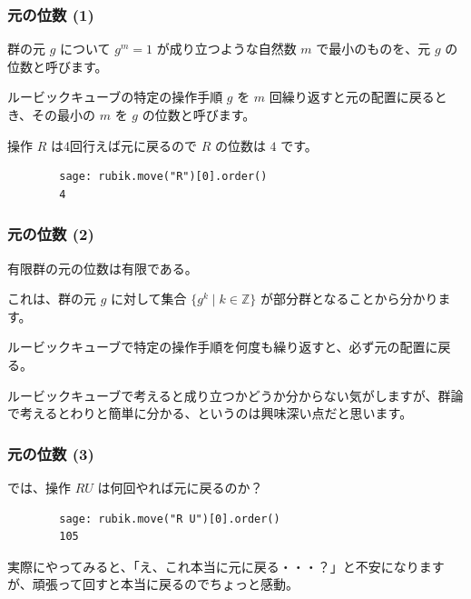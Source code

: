 \documentclass{beamer}
\begin{document}
\begin{frame}[fragile=singleslide]
    \frametitle{元の位数 (1)}

    \begin{definition}
        群の元 \(g\) について \(g^m = 1\) が成り立つような自然数 \(m\) で最小のものを、元 \(g\) の位数と呼びます。
    \end{definition}

    \begin{definition}
        ルービックキューブの特定の操作手順 \(g\) を \(m\) 回繰り返すと元の配置に戻るとき、その最小の \(m\) を \(g\) の位数と呼びます。
    \end{definition}

    操作 \(R\) は4回行えば元に戻るので \(R\) の位数は \(4\) です。

    \begin{verbatim}
        sage: rubik.move("R")[0].order()
        4
    \end{verbatim}
\end{frame}

\begin{frame}
    \frametitle{元の位数 (2)}

    \begin{theorem}
        有限群の元の位数は有限である。
    \end{theorem}

    これは、群の元 \(g\) に対して集合 \(\{ g^k \mid k \in \mathbb{Z}\}\) が部分群となることから分かります。

    \begin{theorem}
        ルービックキューブで特定の操作手順を何度も繰り返すと、必ず元の配置に戻る。
    \end{theorem}

    ルービックキューブで考えると成り立つかどうか分からない気がしますが、群論で考えるとわりと簡単に分かる、というのは興味深い点だと思います。
\end{frame}

\begin{frame}[fragile=singleslide]
    \frametitle{元の位数 (3)}

    では、操作 \(R U\) は何回やれば元に戻るのか？

    \begin{verbatim}
        sage: rubik.move("R U")[0].order()
        105
    \end{verbatim}

    \bigskip

    実際にやってみると、「え、これ本当に元に戻る・・・？」と不安になりますが、頑張って回すと本当に戻るのでちょっと感動。
\end{frame}
\end{document}
